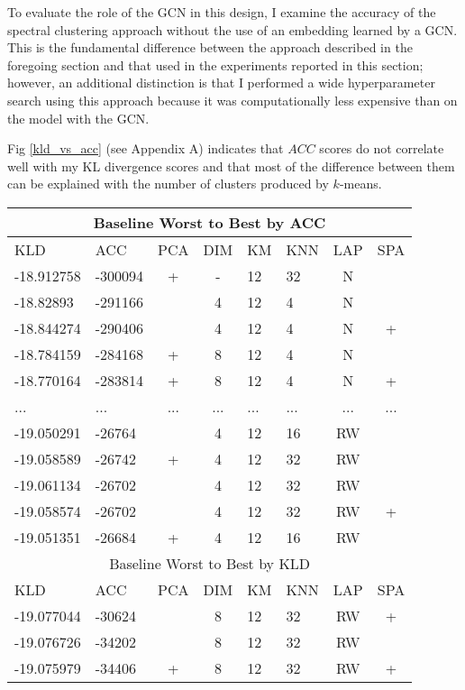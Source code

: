 \documentclass{article}
\begin{document}
To evaluate the role of the GCN in this design, I examine the accuracy of the spectral clustering approach without the use of an embedding learned by a GCN. This is the fundamental difference between the approach described in the foregoing section and that used in the experiments reported in this section; however, an additional distinction is that I performed a wide hyperparameter search using this approach because it was computationally less expensive than on the model with the GCN.

Fig \ref{kld_vs_acc} (see Appendix A) indicates that $ACC$ scores do not correlate well with my KL divergence scores and that most of the difference between them can be explained with the number of clusters produced by $k$-means.

\begin{table}[ht]
    \centering
    \begin{tabular}{|l|l|c|c|l|l|c|c}
    \multicolumn{8}{c}{Baseline Worst to Best by ACC} \\\hline
    KLD & ACC & PCA & DIM & KM & KNN & LAP & SPA \\\hline
    -18.912758 & -300094 & + & - & 12 & 32 & N & \\
    -18.82893 & -291166 &  & 4 & 12 & 4 & N & \\
    -18.844274 & -290406 &  & 4 & 12 & 4 & N & +\\
    -18.784159 & -284168 & + & 8 & 12 & 4 & N & \\
    -18.770164 & -283814 & + & 8 & 12 & 4 & N & +\\
    ... & ... & ... & ... & ... & ... & ... & ...\\
    -19.050291 & -26764 &  & 4 & 12 & 16 & RW & \\
    -19.058589 & -26742 & + & 4 & 12 & 32 & RW & \\
    -19.061134 & -26702 &  & 4 & 12 & 32 & RW & \\
    -19.058574 & -26702 &  & 4 & 12 & 32 & RW & +\\
    -19.051351 & -26684 & + & 4 & 12 & 16 & RW & \\
    \multicolumn{8}{c}{Baseline Worst to Best by KLD} \\\hline
    KLD & ACC & PCA & DIM & KM & KNN & LAP & SPA \\\hline
    -19.077044 & -30624 &  & 8 & 12 & 32 & RW & +\\
    -19.076726 & -34202 &  & 8 & 12 & 32 & RW & \\
    -19.075979 & -34406 & + & 8 & 12 & 32 & RW & +\\

\end{tabular}
\end{table}
\end{document}

